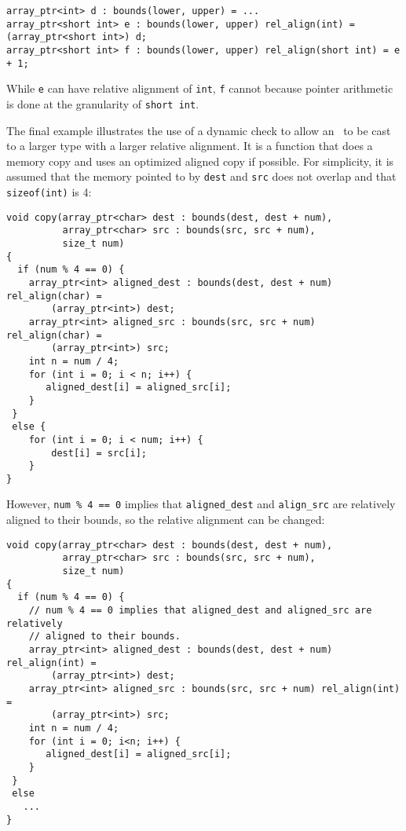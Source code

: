\begin{verbatim}
array_ptr<int> d : bounds(lower, upper) = ...
array_ptr<short int> e : bounds(lower, upper) rel_align(int) = (array_ptr<short int>) d;
array_ptr<short int> f : bounds(lower, upper) rel_align(short int) = e + 1;
\end{verbatim}

While \texttt{e} can have relative alignment of \texttt{int}, \texttt{f}
cannot because pointer arithmetic is done at the granularity of
\texttt{short int}.

The final example illustrates the use of a dynamic check to allow an
\arrayptrchar\ to be cast to a larger type with a larger relative alignment.
It is a function that does a memory copy and uses an optimized aligned copy if
possible.  For simplicity, it is assumed that the memory pointed to by
\texttt{dest} and \texttt{src} does not overlap and that \texttt{sizeof(int)} is 4:
\begin{verbatim}
void copy(array_ptr<char> dest : bounds(dest, dest + num),
          array_ptr<char> src : bounds(src, src + num), 
          size_t num)
{
  if (num % 4 == 0) {
    array_ptr<int> aligned_dest : bounds(dest, dest + num) rel_align(char) =
        (array_ptr<int>) dest;
    array_ptr<int> aligned_src : bounds(src, src + num) rel_align(char) =
        (array_ptr<int>) src;
    int n = num / 4;
    for (int i = 0; i < n; i++) {
       aligned_dest[i] = aligned_src[i];
    }
 }
 else {
    for (int i = 0; i < num; i++) {
        dest[i] = src[i];
    }
}
\end{verbatim}

However, \texttt{num \% 4 == 0} implies that \texttt{aligned\_dest} and
\texttt{align\_src} are relatively aligned to their bounds, so the
relative alignment can be changed:

\begin{verbatim}
void copy(array_ptr<char> dest : bounds(dest, dest + num),
          array_ptr<char> src : bounds(src, src + num), 
          size_t num)
{
  if (num % 4 == 0) {
    // num % 4 == 0 implies that aligned_dest and aligned_src are relatively
    // aligned to their bounds.
    array_ptr<int> aligned_dest : bounds(dest, dest + num) rel_align(int) =
        (array_ptr<int>) dest;
    array_ptr<int> aligned_src : bounds(src, src + num) rel_align(int) =
        (array_ptr<int>) src;
    int n = num / 4;
    for (int i = 0; i<n; i++) {
       aligned_dest[i] = aligned_src[i];
    }
 }
 else  
   ...
}
\end{verbatim}

